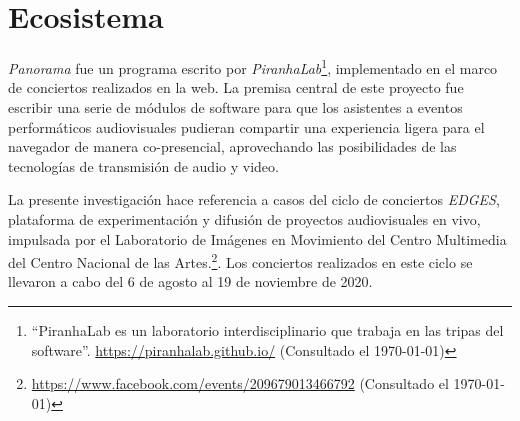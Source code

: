 
\section*{Ecosistema}

\textit{Panorama} \citep{panorama} fue un programa escrito por \textit{PiranhaLab}\footnote{``PiranhaLab es un laboratorio interdisciplinario que trabaja en las tripas del software''. \url{https://piranhalab.github.io/} (Consultado el \today)}, implementado en el marco de conciertos realizados en la web. La premisa central de este proyecto fue escribir una serie de módulos de software para que los asistentes a eventos performáticos audiovisuales pudieran compartir una experiencia ligera para el navegador de manera co-presencial, aprovechando las posibilidades de las tecnologías de transmisión de audio y video. %

La presente investigación hace referencia a casos del ciclo de conciertos \textit{EDGES}, plataforma de experimentación y difusión de proyectos audiovisuales en vivo, impulsada por el Laboratorio de Imágenes en Movimiento del Centro Multimedia del Centro Nacional de las Artes.\footnote{\url{https://www.facebook.com/events/209679013466792} (Consultado el \today)}. Los conciertos realizados en este ciclo se llevaron a cabo del 6 de agosto al 19 de noviembre de 2020.





